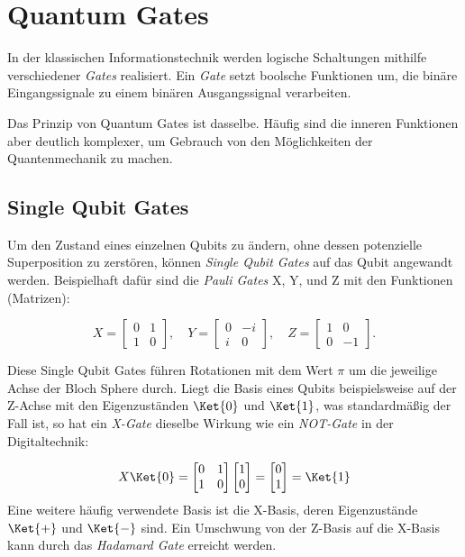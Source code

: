 \section{Quantum Gates}\newline


In der klassischen Informationstechnik werden logische Schaltungen mithilfe verschiedener \textit{Gates} realisiert. Ein \textit{Gate} setzt boolsche Funktionen um, die binäre Eingangssignale zu einem binären Ausgangssignal verarbeiten. \newline

Das Prinzip von Quantum Gates ist dasselbe. Häufig sind die inneren Funktionen aber deutlich komplexer, um Gebrauch von den Möglichkeiten der Quantenmechanik zu machen. \newline
\newline
\subsection{Single Qubit Gates} \newline

Um den Zustand eines einzelnen Qubits zu ändern, ohne dessen potenzielle Superposition zu zerstören, können \textit{Single Qubit Gates} auf das Qubit angewandt werden. Beispielhaft dafür sind die \textit{Pauli Gates} X, Y, und Z mit den Funktionen (Matrizen):

\begin{equation}
    X = \begin{bmatrix} 0 & 1 \\ 1 & 0 \end{bmatrix},\quad Y = \begin{bmatrix} 0 & -i \\ i & 0 \end{bmatrix},\quad Z = \begin{bmatrix} 1 & 0 \\ 0 & -1 \end{bmatrix}.
\end{equation}

Diese Single Qubit Gates führen Rotationen mit dem Wert \(\pi\) um die jeweilige Achse der Bloch Sphere durch. Liegt die Basis eines Qubits beispielsweise auf der Z-Achse mit den Eigenzuständen \(\Ket{0}\) und \(\Ket{1}\), was standardmäßig der Fall ist, so hat ein \textit{X-Gate} dieselbe Wirkung wie ein \textit{NOT-Gate} in der Digitaltechnik:

\[X\Ket{0} = \begin{bmatrix}0 & 1 \\ 1 & 0\end{bmatrix} \begin{bmatrix}1\\0\end{bmatrix} = \begin{bmatrix}0\\1\end{bmatrix} = \Ket{1}\]
Eine weitere häufig verwendete Basis ist die X-Basis, deren Eigenzustände\(\Ket{+}\) und \(\Ket{-}\) sind. Ein Umschwung von der Z-Basis auf die X-Basis kann durch das \textit{Hadamard Gate} erreicht werden.

